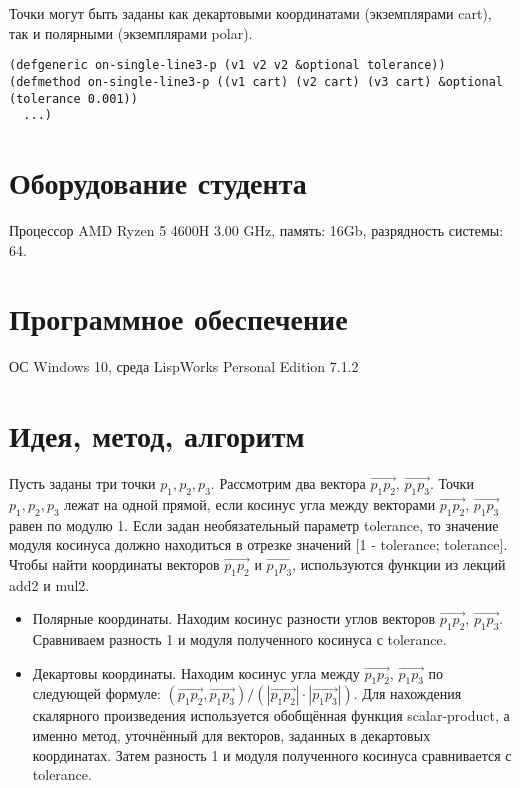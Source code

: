 \documentclass[12pt]{article}
\begin{document}
Точки могут быть заданы как декартовыми координатами (экземплярами cart), так и полярными (экземплярами polar).

\begin{verbatim}
(defgeneric on-single-line3-p (v1 v2 v2 &optional tolerance))
(defmethod on-single-line3-p ((v1 cart) (v2 cart) (v3 cart) &optional (tolerance 0.001))
  ...)
\end{verbatim}


\section{Оборудование студента}
Процессор AMD Ryzen 5 4600H 3.00 GHz, память: 16Gb, разрядность системы: 64.

\section{Программное обеспечение}
ОС Windows 10, среда LispWorks Personal Edition 7.1.2

\section{Идея, метод, алгоритм}

Пусть заданы три точки $p_1, p_2, p_3$. Рассмотрим два вектора $\overrightarrow{p_1p_2}$, $\overrightarrow{p_1p_3}$. Точки $p_1, p_2, p_3$ лежат на одной прямой, если косинус угла между векторами $\overrightarrow{p_1p_2}$, $\overrightarrow{p_1p_3}$ равен по модулю 1. Если задан необязательный параметр tolerance, то значение модуля косинуса должно находиться в отрезке значений [1 - tolerance; tolerance]. Чтобы найти координаты векторов $\overrightarrow{p_1p_2}$ и $\overrightarrow{p_1p_3}$, используются функции из лекций add2 и mul2.

\begin{itemize}
    \item Полярные координаты. Находим косинус разности углов векторов $\overrightarrow{p_1p_2}$, $\overrightarrow{p_1p_3}$. Сравниваем разность 1 и модуля полученного косинуса с tolerance.
    \item Декартовы координаты. Находим косинус угла между $\overrightarrow{p_1p_2}$, $\overrightarrow{p_1p_3}$ по следующей формуле: $(\overrightarrow{p_1p_2}, \overrightarrow{p_1p_3}) / (|\overrightarrow{p_1p_2}| \cdot |\overrightarrow{p_1p_3}|)$. Для нахождения скалярного произведения используется обобщённая функция scalar-product, а именно метод, уточнённый для векторов, заданных в декартовых координатах. Затем разность 1 и модуля полученного косинуса сравнивается с tolerance.
\end{itemize}
\end{document}
